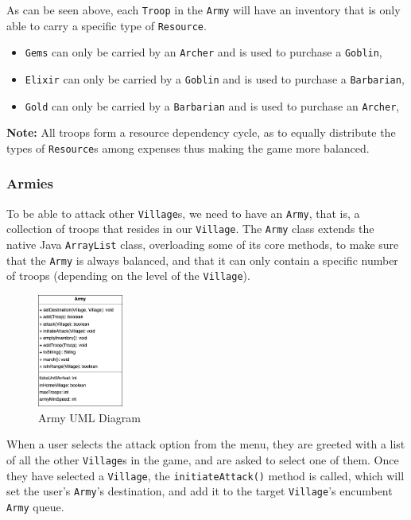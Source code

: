 \documentclass{article}
\newcommand{\code}[1]{\texttt{#1}}
\begin{document}
As can be seen above, each \code{Troop} in the \code{Army} will have an
inventory that is only able to carry a specific type of \code{Resource}. 

\begin{itemize}
	\item \code{Gems} can only be carried by an \code{Archer} and is used to
	      purchase a \code{Goblin},
	\item \code{Elixir} can only be carried by a \code{Goblin} and is used to
	      purchase a \code{Barbarian},
	\item \code{Gold} can only be carried by a \code{Barbarian} and is used to
	      purchase an \code{Archer},
\end{itemize}

\textbf{Note:}  All troops form a resource dependency cycle, as to equally distribute the types of 
\code{Resource}s among expenses thus making the game more balanced.

\newpage

\subsubsection*{Armies}

To be able to attack other \code{Village}s, we need to have an \code{Army}, that is, a collection 
of troops that resides in our \code{Village}. The \code{Army} class extends the native Java
\code{ArrayList} class, overloading some of its core methods, to make sure that the \code{Army}
is always balanced, and that it can only contain a specific number of troops (depending on the level of the \code{Village}).

\begin{figure}[h]
	\vspace{1em}
	\centering
	\includegraphics[width=0.25\textwidth]{images/army.png}
	\caption{Army UML Diagram}
\end{figure}

When a user selects the attack option from the menu, they are greeted with a
list of all the other \code{Village}s in the game, and are asked to select one
of them. Once they have selected a \code{Village}, the \code{initiateAttack()}
method is called, which will set the user's \code{Army}'s destination, and add it to 
the target \code{Village}'s encumbent \code{Army} queue.
\end{document}
